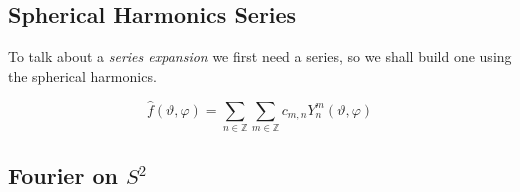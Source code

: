 \subsection{Spherical Harmonics Series}

To talk about a \emph{series expansion} we first need a series, so we shall
build one using the spherical harmonics.

\begin{definition}
  \begin{equation*}
    \hat{f}(\vartheta, \varphi) 
    = \sum_{n \in \mathbb{Z}} \sum_{m \in \mathbb{Z}}
      c_{m,n} Y^m_n(\vartheta, \varphi)
  \end{equation*}
\end{definition}

\subsection{Fourier on $S^2$}
